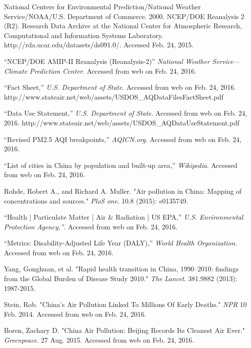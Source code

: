 \documentclass[11pt]{article} %
\begin{document}
\begin{thebibliography}{1}

 National Centers for Environmental Prediction/National Weather Service/NOAA/U.S. Department of Commerce. 2000. NCEP/DOE Reanalysis 2 (R2). Research Data Archive at the National Center for Atmospheric Research, Computational and Information Systems Laboratory. http://rda.ucar.edu/datasets/ds091.0/. Accessed Feb. 24, 2015.

 ``NCEP/DOE AMIP-II Reanalysis (Reanalysis-2)'' \textit{National Weather Service---Climate Prediction Center}. Accessed from web on Feb. 24, 2016.

 ``Fact Sheet,'' \textit{U.S.  Department of State}. Accessed from web on Feb. 24, 2016.
http://www.stateair.net/web/assets/USDOS\_AQDataFilesFactSheet.pdf

 ``Data Use Statement,'' \textit{U.S.  Department of State}. Accessed from web on Feb. 24, 2016.
http://www.stateair.net/web/assets/USDOS\_AQDataUseStatement.pdf

 ``Revised PM2.5 AQI breakpoints,'' \textit{AQICN.org}. Accessed from web on Feb. 24, 2016.

 	``List of cities in China by population and built-up area,'' \textit{Wikipedia}. Accessed from web on Feb. 24, 2016.

 Rohde, Robert A., and Richard A. Muller. "Air pollution in China: Mapping of concentrations and sources." \textit{PloS one}. 10.8 (2015): e0135749.

 ``Health | Particulate Matter | Air \& Radiation | US EPA,'' \textit{U.S. Environmental Protection Agency,''}. Accessed from web on Feb. 24, 2016.

 ``Metrics: Disability-Adjusted Life Year (DALY),'' \textit{World Health Organization}. Accessed from web on Feb. 24, 2016.

Yang, Gonghuan, et al. "Rapid health transition in China, 1990–2010: findings from the Global Burden of Disease Study 2010." \textit{The Lancet}. 381.9882 (2013): 1987-2015.

Stein, Rob. "China's Air Pollution Linked To Millions Of Early Deaths." \textit{NPR} 10 Feb. 2014. Accessed from web on Feb. 24, 2016.

Boren, Zachary D. "China Air Pollution: Beijing Records Its Cleanest Air Ever." \textit{Greenpeace}. 27 Aug. 2015. Accessed from web on Feb. 24, 2016.


\end{thebibliography}
\end{document}
